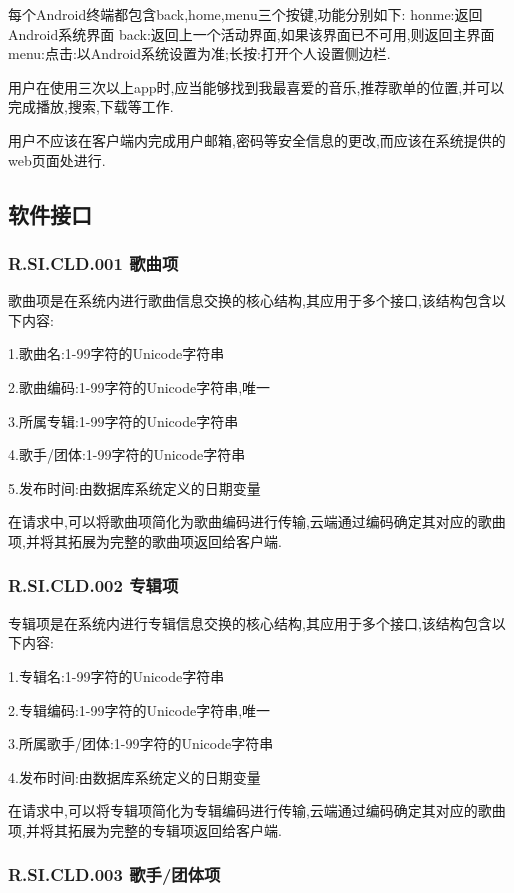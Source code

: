 每个Android终端都包含back,home,menu三个按键,功能分别如下:
honme:返回Android系统界面
back:返回上一个活动界面,如果该界面已不可用,则返回主界面
menu:点击:以Android系统设置为准;长按:打开个人设置侧边栏.

用户在使用三次以上app时,应当能够找到我最喜爱的音乐,推荐歌单的位置,并可以完成播放,搜索,下载等工作.

用户不应该在客户端内完成用户邮箱,密码等安全信息的更改,而应该在系统提供的web页面处进行.




\subsection{软件接口}

\subsubsection{R.SI.CLD.001 歌曲项}

歌曲项是在系统内进行歌曲信息交换的核心结构,其应用于多个接口,该结构包含以下内容:

1.歌曲名:1-99字符的Unicode字符串

2.歌曲编码:1-99字符的Unicode字符串,唯一

3.所属专辑:1-99字符的Unicode字符串

4.歌手/团体:1-99字符的Unicode字符串

5.发布时间:由数据库系统定义的日期变量

在请求中,可以将歌曲项简化为歌曲编码进行传输,云端通过编码确定其对应的歌曲项,并将其拓展为完整的歌曲项返回给客户端.

\subsubsection{R.SI.CLD.002 专辑项}

专辑项是在系统内进行专辑信息交换的核心结构,其应用于多个接口,该结构包含以下内容:

1.专辑名:1-99字符的Unicode字符串

2.专辑编码:1-99字符的Unicode字符串,唯一

3.所属歌手/团体:1-99字符的Unicode字符串

4.发布时间:由数据库系统定义的日期变量

在请求中,可以将专辑项简化为专辑编码进行传输,云端通过编码确定其对应的歌曲项,并将其拓展为完整的专辑项返回给客户端.

\subsubsection{R.SI.CLD.003 歌手/团体项}

